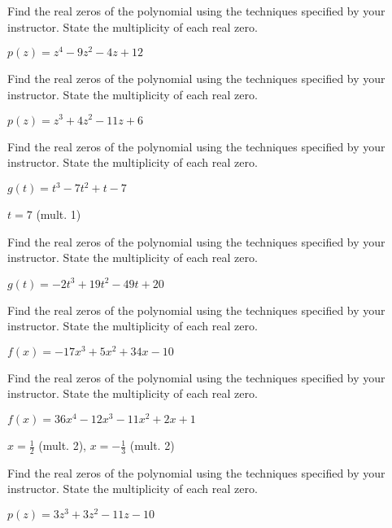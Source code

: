 \documentclass{ximera}
\begin{document}
\begin{problem}
Find the real zeros of the polynomial using the techniques specified by your instructor.  State the multiplicity of each real zero.

$p(z) = z^{4} - 9z^{2} - 4z + 12$
\end{problem}

\begin{problem}
Find the real zeros of the polynomial using the techniques specified by your instructor.  State the multiplicity of each real zero.

$p(z) = z^{3} + 4z^{2} - 11z + 6$
\end{problem}

\begin{problem}
Find the real zeros of the polynomial using the techniques specified by your instructor.  State the multiplicity of each real zero.

$g(t) = t^{3} - 7t^{2} + t - 7$

\begin{solution}
$t = 7$ (mult. 1) 
\end{solution}
\end{problem}

\begin{problem}
Find the real zeros of the polynomial using the techniques specified by your instructor.  State the multiplicity of each real zero.

$g(t) = -2t^{3} + 19t^{2} - 49t + 20$
\end{problem}

\begin{problem}
Find the real zeros of the polynomial using the techniques specified by your instructor.  State the multiplicity of each real zero.

$f(x) = -17x^{3} + 5x^{2} + 34x - 10$
\end{problem}

\begin{problem}
Find the real zeros of the polynomial using the techniques specified by your instructor.  State the multiplicity of each real zero.

$f(x) = 36x^{4} - 12x^{3} - 11x^{2} + 2x + 1$

\begin{solution}
$x = \frac{1}{2}$ (mult. 2), $x = -\frac{1}{3}$ (mult. 2) 
\end{solution}
\end{problem}

\begin{problem}
Find the real zeros of the polynomial using the techniques specified by your instructor.  State the multiplicity of each real zero.

$p(z) = 3z^{3} + 3z^{2} - 11z - 10$
\end{problem}
\end{document}
